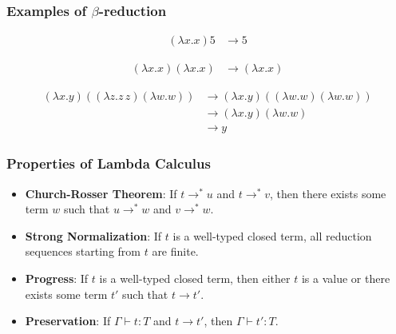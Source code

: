 \documentclass{beamer}
\begin{document}
\begin{frame}
\frametitle{Examples of $\beta$-reduction}
\begin{align*}
(\lambda x. x) 5 &\to 5
\end{align*}

\begin{align*}
(\lambda x. x) (\lambda x. x) &\to (\lambda x. x)
\end{align*}

\begin{align*}
(\lambda x. y)((\lambda z. z\,z)(\lambda w. w)) &\to (\lambda x. y)((\lambda w. w)(\lambda w. w)) \\
&\to (\lambda x. y)(\lambda w. w) \\
&\to y
\end{align*}
\end{frame}


\begin{frame}
\frametitle{Properties of Lambda Calculus}
\begin{itemize}
    \item \textbf{Church-Rosser Theorem}: If $t \rightarrow^* u$ and $t \rightarrow^* v$, then there exists some term $w$ such that $u \rightarrow^* w$ and $v \rightarrow^* w$.
    \item \textbf{Strong Normalization}: If $t$ is a well-typed closed
      term, all reduction sequences starting from $t$ are finite.
    \item \textbf{Progress}: If $t$ is a well-typed closed term, then either $t$ is a value or there exists some term $t'$ such that $t \rightarrow t'$.
    \item \textbf{Preservation}: If $\Gamma \vdash t : T$ and $t \rightarrow t'$, then $\Gamma \vdash t' : T$.
\end{itemize}
\end{frame}
\end{document}
